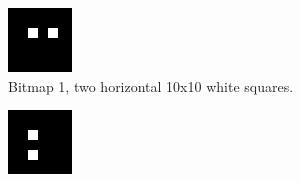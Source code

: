 \documentclass[12pt]{article}
\begin{document}
\begin{figure}
\centering
\begin{subfigure}[b]{.3\linewidth}
\includegraphics[width=\linewidth]{squares-horizontal.png}
\caption{Bitmap 1, two horizontal 10x10 white squares.}
\label{fig:squares-horizontal}
\end{subfigure}
\begin{subfigure}[b]{.3\linewidth}
\includegraphics[width=\linewidth]{squares-vertical.png}

\end{subfigure}
\end{figure}
\end{document}
